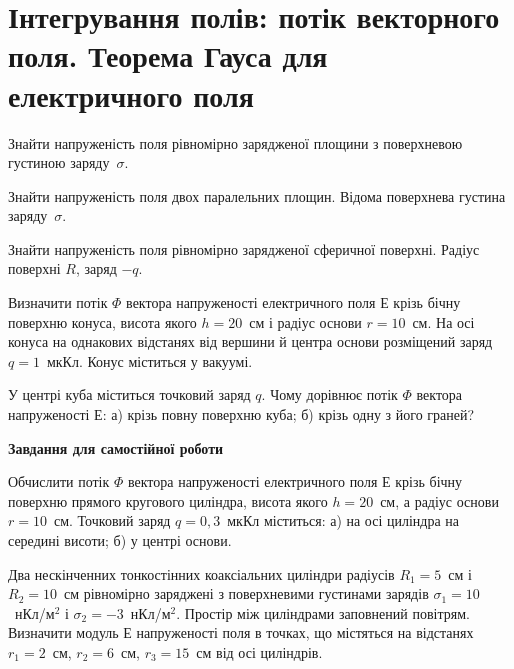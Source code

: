 \setcounter{section}{5}

\section{Інтегрування полів: потік векторного поля. Теорема Гауса для електричного поля}
\begin{problem}{1}
Знайти напруженість поля рівномірно зарядженої площини з поверхневою густиною заряду~$\sigma$.
\end{problem}

\begin{problem}{2}
Знайти напруженість поля двох паралельних площин. Відома поверхнева густина заряду~$\sigma$.
\end{problem}

\begin{problem}{3}
Знайти напруженість поля рівномірно зарядженої сферичної поверхні. Радіус поверхні $R$, заряд $-q$.
\end{problem}

\begin{problem}{4}
Визначити потік $\Phi$ вектора напруженості електричного поля $Е$ крізь бічну поверхню конуса, висота якого $h = 20$~см і радіус основи $r = 10$~см. На осі конуса на однакових відстанях від вершини й центра основи розміщений заряд $q = 1$~мкКл. Конус міститься у вакуумі.
\end{problem}

\begin{problem}{5}
У центрі куба міститься точковий заряд $q$. Чому дорівнює потік $\Phi$ вектора напруженості $Е$: а) крізь повну поверхню куба; б) крізь одну з його граней?
\end{problem}

\textbf{Завдання для самостійної роботи}

\begin{problem}{6}
Обчислити потік $\Phi$ вектора напруженості електричного поля $Е$ крізь бічну поверхню прямого кругового циліндра, висота якого $h = 20$~см, а радіус основи $r = 10$~см. Точковий заряд $q= 0,3$~мкКл міститься: а) на осі циліндра на середині висоти; б) у центрі основи.
\end{problem}

\begin{problem}{7}
Два нескінченних тонкостінних коаксіальних циліндри радіусів $R_1 = 5$~см і $R_2 = 10$~см рівномірно заряджені з поверхневими густинами зарядів $\sigma_1= 10$~нКл/м$^2$ і $\sigma_2= -3$~нКл/м$^2$. Простір між циліндрами заповнений повітрям.
Визначити модуль $Е$ напруженості поля в точках, що містяться на відстанях $r_1 = 2$~см, $r_2 =6$~см, $r_3 = 15$~см від осі циліндрів.
\end{problem}

